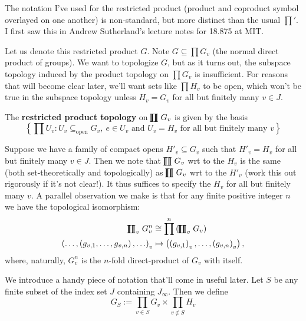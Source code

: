 \documentclass[11pt, x11names, openany]{book}
\newcommand{\set}[1]{\left\{ #1 \right\}}
\renewcommand{\brack}[1]{\left(   #1 \right)}
\newcommand{\rprod}{
    \mathrel{\ooalign{\hidewidth $\prod$ \hidewidth \cr $\coprod$}}
}
\begin{document}
\begin{remark}[Notation]
The notation I've used for the restricted product (product and coproduct symbol overlayed on one another) is non-standard, but more distinct than the usual $\prod'$. I first saw this in Andrew Sutherland's lecture notes for 18.875 at MIT.
\end{remark}

Let us denote this restricted product $G$. Note $G \subseteq \prod G_v$ (the normal
direct product of groups). We want to topologize $G$, but as it turns out, the subspace topology induced by the product topology on $\prod G_v$ is insufficient. For reasons that will become clear later, we'll want sets like $\prod H_v$ to be open, which won't be true in the subspace topology unless $H_v = G_v$ for all but finitely many $v \in J$.

\begin{defn}
\label{def: resprod topology}
    The \textbf{restricted product topology} on $\rprod G_v$ is given by the basis
    \begin{equation*}
        \set{\prod U_v : U_v \subseteq_{\text{open}} G_v, \ e \in U_v \text{ and } U_v = H_v \text{ for all but finitely many } v}
    \end{equation*}
\end{defn}

\begin{observation}
Suppose we have a family of compact opens $H'_v \subseteq G_v$ such that $H'_v = H_v$ for all but finitely many $v \in J$. Then we note that $\rprod G_v$ wrt to the $H_v$ is the same (both set-theoretically and topologically) as $\rprod G_v$ wrt to the $H'_v$ (work this out rigorously if it's not clear!). It thus suffices to specify the $H_v$ for all but finitely many $v$. A parallel observation we make is that for any finite positive integer $n$ we have the topological isomorphism:
\begin{align}
\label{eqn: resprod dir-prod isomorphism}
    \rprod_v G_v^n  &\cong \prod^n \brack{ \rprod_v G_v} \nonumber \\
    \brack{ \ldots, \brack{g_{v, 1}, \ldots, g_{v, n}}, \ldots}_v &\mapsto \brack{\brack{g_{v, 1}}_v, \ldots, \brack{g_{v, n}}_v},
\end{align}
where, naturally, $G^n_v$ is the $n$-fold direct-product of $G_v$ with itself. 
\end{observation}

We introduce a handy piece of notation that'll come in useful later. Let $S$ be any finite subset of the index set $J$ containing $J_\infty$. Then we define
\begin{equation}
\label{eqn: G_S restricted prod}
    G_S := \prod_{v \in S} G_v \times \prod_{v \notin S} H_v
\end{equation}
\end{document}
